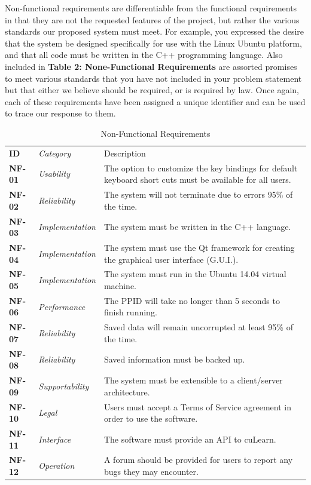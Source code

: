 \documentclass[12pt,letterpaper]{article}
\begin{document}
Non-functional requirements are differentiable from the functional requirements in that they are not the requested features of the project, but
rather the various standards our proposed system must meet. For example, you expressed the desire that the system be designed specifically 
for use with the Linux Ubuntu platform, and that all code must be written in the C++ programming language. Also included in {\bf Table 2: None-Functional Requirements} are
assorted promises to meet various standards that you have not included in your problem statement but that either we believe should be required, 
or is required by law. Once again, each of these requirements have been assigned a unique identifier and can be used to trace our response to them.

\begin{table}[H]
	\caption{Non-Functional Requirements}
	\begin{tabu} to 
	    \tableheader{}ID & Category & Description\\
		NF-01 & Usability & The option to customize the key bindings for default keyboard short cuts must be available for all users.\\
		NF-02 & Reliability & The system will not terminate due to errors 95\% of the time.\\
		NF-03 & Implementation & The system must be written in the C++ language. \\
		NF-04 & Implementation & The system must use the Qt framework for creating the graphical user interface (G.U.I.). \\
		NF-05 & Implementation & The system must run in the Ubuntu 14.04 virtual machine. \\
		NF-06 & Performance & The PPID will take no longer than 5 seconds to finish running. \\
		NF-07 & Reliability & Saved data will remain uncorrupted at least 95\% of the time. \\
		NF-08 & Reliability & Saved information must be backed up. \\
		NF-09 & Supportability & The system must be extensible to a client/server architecture. \\
		NF-10 & Legal & Users must accept a Terms of Service agreement in order to use the software.\\
		NF-11 & Interface & The software must provide an API to cuLearn.\\
		NF-12 & Operation & A forum should be provided for users to report any bugs they may encounter. \\

\end{tabu}
\end{table}
\end{document}
